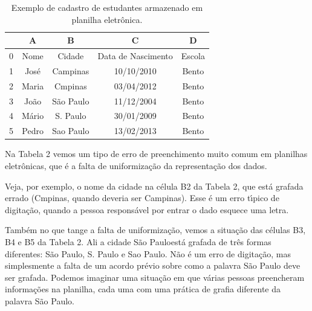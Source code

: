 \documentclass[
12pt,		%
openright,	%
twoside,  %
a4paper,			%
chapter=TITLE,		%
english,			%
french,				%
spanish,			%
brazil				%
]{USPSC-classe/USPSC}
\begin{document}
\begin{table}[htb]
\tiny
\caption{\label{ddd7a335bbc10f88eaaf4abda266d151f0ba0e6f}Exemplo de cadastro de estudantes armazenado em planilha eletr\^onica.}

\centering
\begin{tabular}{|c|c|c|c|c|}
\hline
  &  A  &  B  &  C  &  D  \\
\hline
0 & Nome  &  Cidade  &  Data de Nascimento  &  Escola \\
1 & Jos\'e  &  Campinas  &  10/10/2010  &  Bento \\
2 & Maria  &  Cmpinas  &  03/04/2012  &  Bento \\
3 & Jo\~ao  &  S\~ao Paulo  &  11/12/2004  &  Bento \\
4 & M\'ario  &  S. Paulo  &  30/01/2009  &  Bento \\
5 & Pedro  &  Sao Paulo  &  13/02/2013  &  Bento \\
\hline
\end{tabular}
\end{table}


Na Tabela 2 vemos um tipo de erro de preenchimento muito comum em planilhas eletr\^onicas, que \'e a falta de uniformiza\c{c}\~ao da representa\c{c}\~ao dos dados.

















Veja, por exemplo, o nome da cidade na c\'elula B2 da Tabela 2, que est\'a grafada errado (Cmpinas, quando deveria ser Campinas). Esse \'e um erro t\'{\i}pico de digita\c{c}\~ao, quando a pessoa respons\'avel por entrar o dado esquece uma letra.

















Tamb\'em no que tange a falta de uniformiza\c{c}\~ao, vemos a situa\c{c}\~ao das c\'elulas B3, B4 e B5 da Tabela 2. Ali a cidade \textquotedbl S\~ao Paulo\textquotedbl  est\'a grafada de tr\^es formas diferentes: S\~ao Paulo, S. Paulo e Sao Paulo. N\~ao \'e um erro de digita\c{c}\~ao, mas simplesmente a falta de um acordo pr\'evio sobre como a palavra S\~ao Paulo deve ser grafada. Podemos imaginar uma situa\c{c}\~ao em que v\'arias pessoas preencheram informa\c{c}\~oes na planilha, cada uma com uma pr\'atica de grafia diferente da palavra S\~ao Paulo.
\end{document}
